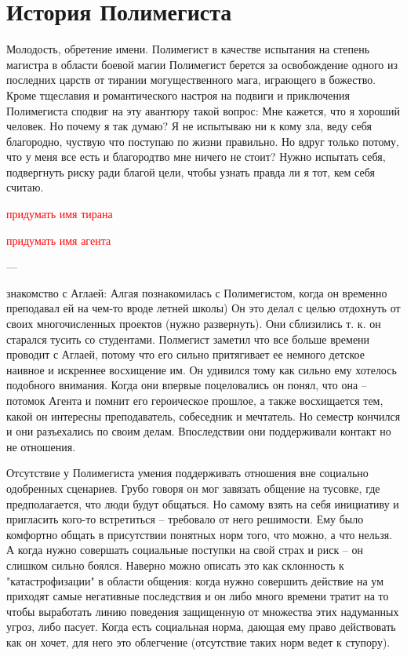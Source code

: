 \documentclass[12pt,a4paper]{article}
\newcommand{\tr}[1]{\textcolor{red}{#1}}
\begin{document}
\section*{История Полимегиста}

Молодость, обретение имени. 
Полимегист в качестве испытания на степень магистра в области боевой магии Полимегист берется за освобождение одного из последних царств от тирании могущественного мага, играющего в божество.
Кроме тщеславия и романтического настроя на подвиги и приключения Полимегиста сподвиг на эту авантюру такой вопрос: Мне кажется, что я хороший человек. Но почему я так думаю? Я не испытываю ни к кому зла, веду себя благородно, чуствую что поступаю по жизни правильно. Но вдруг только потому, что у меня все есть и благородтво мне ничего не стоит? Нужно испытать себя, подвергнуть риску ради благой цели, чтобы узнать правда ли я тот, кем себя считаю.

\tr{придумать имя тирана}

\tr{придумать имя агента}


---

знакомство с Аглаей:
Алгая познакомилась с Полимегистом, когда он временно преподавал ей на чем-то вроде летней школы)
Он это делал с целью отдохнуть от своих многочисленных проектов (нужно развернуть). Они сблизились т. к. он старался тусить со студентами. Полмегист заметил что все больше времени проводит с Аглаей, потому что его сильно притягивает ее немного детское наивное и искреннее восхищение им. Он удивился тому как сильно ему хотелось подобного внимания. Когда они впервые поцеловались он понял, что она -- потомок Агента и помнит его героическое прошлое, а также восхищается тем, какой он интересны преподаватель, собеседник и мечтатель.
Но семестр кончился и они разъехались по своим делам.
Впоследствии они поддерживали контакт но не отношения.

Отсутствие у Полимегиста умения поддерживать отношения вне социально одобренных сценариев. Грубо говоря он мог завязать общение на тусовке, где предполагается, что люди будут общаться. Но самому взять на себя инициативу и пригласить кого-то встретиться -- требовало от него решимости. Ему было комфортно общать в присутствии понятных норм того, что можно, а что нельзя. А когда нужно совершать социальные поступки на свой страх и риск -- он слишком сильно боялся. Наверно можно описать это как склонность к "катастрофизации" в области общения: когда нужно совершить действие на ум приходят самые негативные последствия и он либо много времени тратит на то чтобы выработать линию поведения защищенную от множества этих надуманных угроз, либо пасует. Когда есть социальная норма, дающая ему право действовать как он хочет, для него это облегчение (отсутствие таких норм ведет к ступору).
\end{document}
